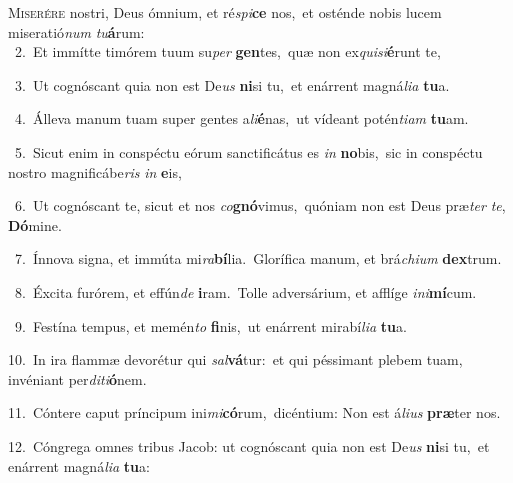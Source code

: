 \lettrine{\initial\textcolor{\initialcolor}{M}}{iserére} nostri, Deus ómnium, et ré\-\textit{spi}\-\textbf{ce} nos,~\star et osténde nobis lucem miseratió\textit{num} \textit{tu}\-\textbf{á}rum:\\
{\numbfont\textcolor{\numbcolor}{~2.}}~Et immítte timórem tuum su\textit{per} \textbf{gen}\-tes,~\star quæ non ex\-\textit{qui}\-\textit{si}\textbf{é}runt te,\par
{\numbfont\textcolor{\numbcolor}{~3.}}~Ut cognóscant quia non est De\textit{us} \textbf{ni}\-si tu,~\star et enárrent magná\-\textit{li}\-\textit{a} \textbf{tu}\-a.\par
{\numbfont\textcolor{\numbcolor}{~4.}}~Álleva manum tuam super gentes a\-\textit{li}\-\textbf{é}nas,~\star ut vídeant potén\-\textit{ti}\-\textit{am} \textbf{tu}\-am.\par
{\numbfont\textcolor{\numbcolor}{~5.}}~Sicut enim in conspéctu eórum sanctificátus es \textit{in} \textbf{no}\-bis,~\star sic in conspéctu nostro magnificábe\textit{ris} \textit{in} \textbf{e}\-is,\par
{\numbfont\textcolor{\numbcolor}{~6.}}~Ut cognóscant te, sicut et nos \textit{co}\-\textbf{gnó}vimus,~\star quóniam non est Deus præ\textit{ter} \textit{te}\-, \textbf{Dó}\-mine.\par
{\numbfont\textcolor{\numbcolor}{~7.}}~Ínnova signa, et immúta mi\-\textit{ra}\-\textbf{bí}lia.~\star Glorífica manum, et brá\-\textit{chi}\-\textit{um} \textbf{dex}\-trum.\par
{\numbfont\textcolor{\numbcolor}{~8.}}~Éxcita furórem, et effún\textit{de} \textbf{i}\-ram.~\star Tolle adversárium, et afflíge \textit{in}\-\textit{i}\textbf{mí}cum.\par
{\numbfont\textcolor{\numbcolor}{~9.}}~Festína tempus, et memén\textit{to} \textbf{fi}\-nis,~\star ut enárrent mirabí\-\textit{li}\-\textit{a} \textbf{tu}\-a.\par
{\numbfont\textcolor{\numbcolor}{10.}}~In ira flammæ devorétur qui \textit{sal}\-\textbf{vá}tur:~\star et qui péssimant plebem tuam, invéniant per\-\textit{di}\-\textit{ti}\textbf{ó}nem.\par
{\numbfont\textcolor{\numbcolor}{11.}}~Cóntere caput príncipum ini\-\textit{mi}\-\textbf{có}rum,~\star dicéntium: Non est á\-\textit{li}\-\textit{us} \textbf{præ}\-ter nos.\par
{\numbfont\textcolor{\numbcolor}{12.}}~Cóngrega omnes tribus Jacob: ut cognóscant quia non est De\textit{us} \textbf{ni}\-si tu,~\star et enárrent magná\-\textit{li}\-\textit{a} \textbf{tu}\-a:\par
